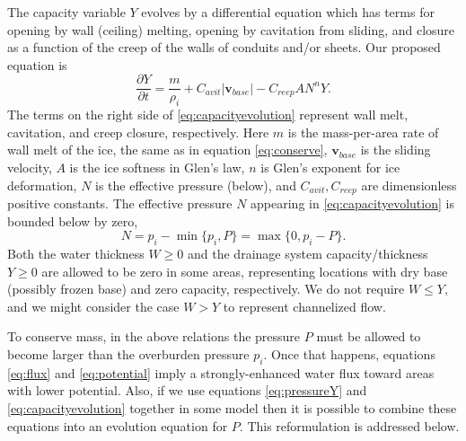 \documentclass[11pt]{amsart}
\newcommand{\Cavit}{C_{avit}}
\newcommand{\Creep}{C_{reep}}
\begin{document}
The capacity variable $Y$ evolves by a differential equation which has terms for opening by wall (ceiling) melting, opening by cavitation from sliding, and closure as a function of the creep of the walls of conduits and/or sheets.  Our proposed equation is
\begin{equation} \label{eq:capacityevolution}
\frac{\partial Y}{\partial t} = \frac{m}{\rho_i} + \Cavit |\mathbf{v}_{base}| - \Creep A N^n Y.
\end{equation}
The terms on the right side of \eqref{eq:capacityevolution} represent wall melt, cavitation, and creep closure, respectively.  Here $m$ is the mass-per-area rate of wall melt of the ice, the same as in equation \eqref{eq:conserve}, $\mathbf{v}_{base}$ is the sliding velocity, $A$ is the ice softness in Glen's law, $n$ is Glen's exponent for ice deformation, $N$ is the effective pressure (below), and $\Cavit,\Creep$ are dimensionless positive constants.  The effective pressure $N$ appearing in \eqref{eq:capacityevolution} is bounded below by zero,
\begin{equation} \label{eq:effectivepressure}
N = p_i - \min\{p_i,P\} = \max\{0,p_i-P\}.
\end{equation}
Both the water thickness $W \ge 0$ and the drainage system capacity/thickness $Y \ge 0$ are allowed to be zero in some areas, representing locations with dry base (possibly frozen base) and zero capacity, respectively.  We do not require $W\le Y$, and we might consider the case $W>Y$ to represent channelized flow.

To conserve mass, in the above relations the pressure $P$ must be allowed to become larger than the overburden pressure $p_i$.  Once that happens, equations \eqref{eq:flux} and \eqref{eq:potential} imply a strongly-enhanced water flux toward areas with lower potential.  Also, if we use equations \eqref{eq:pressureY} and \eqref{eq:capacityevolution} together in some model then it is possible to combine these equations into an evolution equation for $P$.  This reformulation is addressed below.
\end{document}
